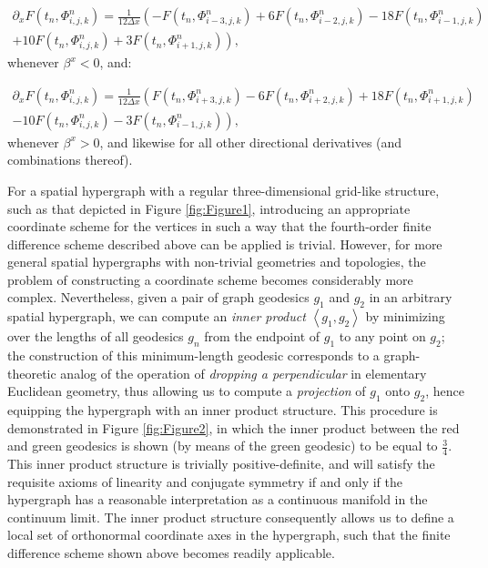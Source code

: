 \documentclass{article}
\begin{document}
\begin{multline}
\partial_x F \left( t_n, \Phi_{i, j, k}^{n} \right) = \frac{1}{12 \Delta x} \left( - F \left( t_n, \Phi_{i - 3, j, k}^{n} \right) + 6 F \left( t_n, \Phi_{i - 2, j, k}^{n} \right) - 18 F \left( t_n, \Phi_{i - 1, j, k}^{n} \right) \right.\\
\left. + 10 F \left( t_n, \Phi_{i, j, k}^{n} \right) + 3 F \left( t_n, \Phi_{i + 1, j, k}^{n} \right) \right),
\end{multline}
whenever ${\beta^x < 0}$, and:

\begin{multline}
\partial_x F \left( t_n, \Phi_{i, j, k}^{n} \right) = \frac{1}{12 \Delta x} \left( F \left( t_n, \Phi_{i + 3, j, k}^{n} \right) - 6 F \left( t_n, \Phi_{i + 2, j, k}^{n} \right) + 18 F \left( t_n, \Phi_{i + 1, j, k}^{n} \right) \right.\\
\left. - 10 F \left( t_n, \Phi_{i, j, k}^{n} \right) -3 F \left( t_n, \Phi_{i - 1, j, k}^{n} \right) \right),
\end{multline}
whenever ${\beta^x > 0}$, and likewise for all other directional derivatives (and combinations thereof).

For a spatial hypergraph with a regular three-dimensional grid-like structure, such as that depicted in Figure \ref{fig:Figure1}, introducing an appropriate coordinate scheme for the vertices in such a way that the fourth-order finite difference scheme described above can be applied is trivial. However, for more general spatial hypergraphs with non-trivial geometries and topologies, the problem of constructing a coordinate scheme becomes considerably more complex. Nevertheless, given a pair of graph geodesics ${g_1}$ and ${g_2}$ in an arbitrary spatial hypergraph, we can compute an \textit{inner product} ${\left\langle g_1, g_2 \right\rangle}$ by minimizing over the lengths of all geodesics ${g_n}$ from the endpoint of ${g_1}$ to any point on ${g_2}$; the construction of this minimum-length geodesic corresponds to a graph-theoretic analog of the operation of \textit{dropping a perpendicular} in elementary Euclidean geometry, thus allowing us to compute a \textit{projection} of ${g_1}$ onto ${g_2}$, hence equipping the hypergraph with an inner product structure. This procedure is demonstrated in Figure \ref{fig:Figure2}, in which the inner product between the red and green geodesics is shown (by means of the green geodesic) to be equal to ${\frac{3}{4}}$. This inner product structure is trivially positive-definite, and will satisfy the requisite axioms of linearity and conjugate symmetry if and only if the hypergraph has a reasonable interpretation as a continuous manifold in the continuum limit. The inner product structure consequently allows us to define a local set of orthonormal coordinate axes in the hypergraph, such that the finite difference scheme shown above becomes readily applicable.
\end{document}
